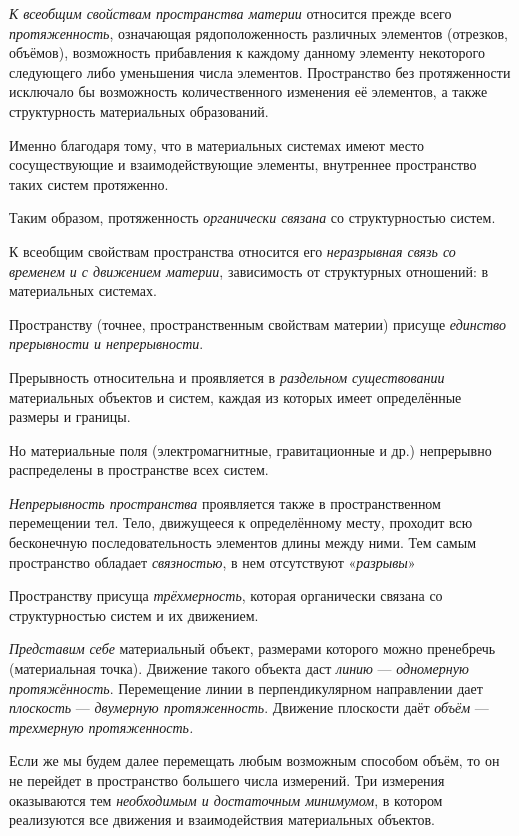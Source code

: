 \documentclass[a4paper,14pt,russian]{extreport}
\begin{document}
\emph{К всеобщим свойствам пространства материи} относится прежде всего \emph{протяженность}, означающая рядоположенность различных элементов (отрезков, объёмов), возможность прибавления к каждому данному элементу некоторого следующего либо уменьшения числа элементов. Пространство без протяженности исключало бы возможность количественного изменения её элементов, а также структурность материальных образований.

Именно благодаря тому, что в материальных системах имеют место сосуществующие и взаимодействующие элементы, внутреннее пространство таких систем протяженно.

Таким образом, протяженность \emph{органически связана} со структурностью систем.

К всеобщим свойствам пространства относится его \emph{неразрывная связь со временем и с движением материи}, зависимость от структурных отношений: в материальных системах.

Пространству (точнее, пространственным свойствам материи) присуще \emph{единство прерывности и непрерывности}.

Прерывность относительна и проявляется в \emph{раздельном существовании} материальных объектов и систем, каждая из которых имеет определённые размеры и границы.

Но материальные поля (электромагнитные, гравитационные и др.) непрерывно распределены в пространстве всех систем.

\emph{Непрерывность пространства} проявляется также в пространственном перемещении тел. Тело, движущееся к определённому месту, проходит всю бесконечную последовательность элементов длины между ними. Тем самым пространство обладает \emph{связностью}, в нем отсутствуют «\emph{разрывы}»

Пространству присуща \emph{трёхмерность}, которая органически связана со структурностью систем и их движением.

\emph{Представим себе} материальный объект, размерами которого можно пренебречь (материальная точка). Движение такого объекта даст \emph{линию} --- \emph{одномерную протяжённость}. Перемещение линии в перпендикулярном направлении дает \emph{плоскость} --- \emph{двумерную протяженность}. Движение плоскости даёт \emph{объём} --- \emph{трехмерную протяженность.}

Если же мы будем далее перемещать любым возможным способом объём, то он не перейдет в пространство большего числа измерений. Три измерения оказываются тем \emph{необходимым и достаточным минимумом}, в котором реализуются все движения и взаимодействия материальных объектов.
\end{document}
